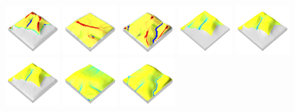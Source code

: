 \documentclass[prodmode,acmtochi]{acmsmall} %
\begin{document}
\begin{figure}[h!]
\begin{center}
		\includegraphics[width=0.18\textwidth]{images/render_3d/mean_forms_3.png}
		\includegraphics[width=0.18\textwidth]{images/render_3d/mean_forms_4.png}
		\includegraphics[width=0.18\textwidth]{images/render_3d/mean_forms_5.png}
		\includegraphics[width=0.18\textwidth]{images/render_3d/mean_depth_1.png}
		\includegraphics[width=0.18\textwidth]{images/render_3d/mean_depth_2.png}
		\includegraphics[width=0.18\textwidth]{images/render_3d/mean_depth_3.png}
		\includegraphics[width=0.18\textwidth]{images/render_3d/mean_depth_4.png}
		\includegraphics[width=0.18\textwidth]{images/render_3d/mean_depth_5.png}

\end{center}
\end{figure}
\end{document}
